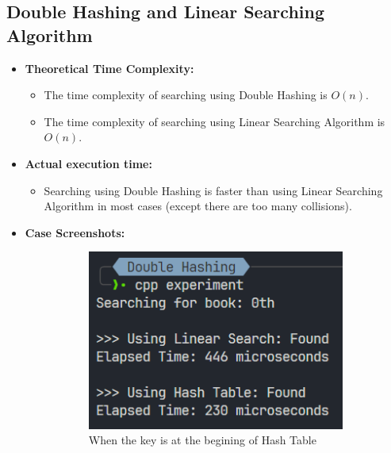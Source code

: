 \pagebreak
\subsection{Double Hashing and Linear Searching Algorithm}
\begin{itemize}
	\item \textbf{Theoretical Time Complexity:}
	      \begin{itemize}
		      \item The time complexity of searching using Double Hashing is \(O(n)\).
		      \item The time complexity of searching using Linear Searching Algorithm is \(O(n)\).
	      \end{itemize}
	\item \textbf{Actual execution time:}
	      \begin{itemize}
		      \item Searching using Double Hashing is faster than using Linear Searching Algorithm in most cases (except there are too many collisions).
	      \end{itemize}
	\item \textbf{Case Screenshots:}
	      \begin{figure}[!ht]
		      \centering
		      \begin{subfigure}{0.45\textwidth}
			      \centering
			      \includegraphics[width=\textwidth]{imgs/Double Hashing/beg.png}
			      \caption{When the key is at the begining of Hash Table}\label{fig:dblhashing-beg-metric}
		      \end{subfigure}
		      \hfill
		      \begin{subfigure}{0.45\textwidth}

\end{subfigure}
\end{figure}
\end{itemize}
